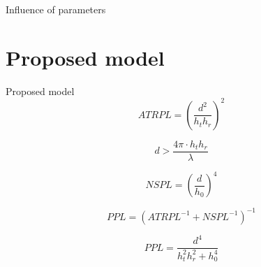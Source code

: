 \documentclass[10pt]{beamer}
\begin{document}
\begin{frame}{Influence of parameters}
\begin{table}[H]
\textcolor{black}{
}

\vspace{1em}
\textcolor{black}{
}
\end{table}
\end{frame}

\section{Proposed model}
\begin{frame}{Proposed model}
\begin{equation*}
ATRPL = \left(\frac{d^2}{h_t h_r}\right)^2
\label{two_ray_model}
\end{equation*}

\begin{equation*}
d > \frac{4\pi \cdot h_t h_r }{\lambda}
\label{two_ray_cond}
\end{equation*}

\begin{equation*}
NSPL=\left(\frac{d}{h_{0}}\right)^4
\label{surface_wave}
\end{equation*}

\begin{equation*}
PPL = \left(ATRPL^{-1} + NSPL^{-1}\right)^{-1} \label{proposedModel1}
\end{equation*}

\begin{equation*}
PPL = \frac{d^4}{h_t^2 h_r^2+h_0^4} \label{proposedModel2}
\end{equation*}

\end{frame}
\end{document}
